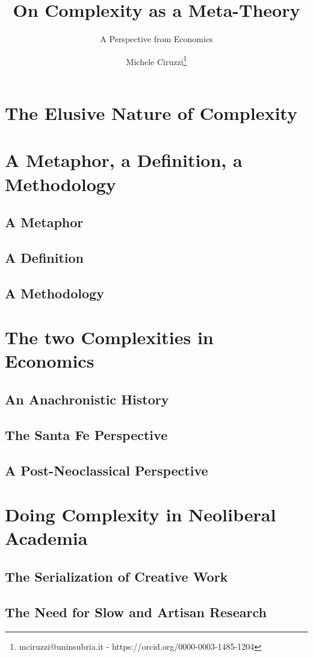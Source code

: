 \documentclass[a4paper, headings=standardclasses]{scrartcl}
\title{On Complexity as a Meta-Theory}
\subtitle{A Perspective from Economics}
\author{Michele Ciruzzi\thanks{mciruzzi@uninsubria.it - https://orcid.org/0000-0003-1485-1204}}
\begin{document}
	
	\maketitle
	
	
	\section{The Elusive Nature of Complexity}
	
	\section{A Metaphor, a Definition, a Methodology}
	\subsection{A Metaphor}
	
	\subsection{A Definition}
	
	\subsection{A Methodology}
	
	\section{The two Complexities in Economics}
	\subsection{An Anachronistic History}
	
	\subsection{The Santa Fe Perspective}
	
	\subsection{A Post-Neoclassical Perspective}
	
	\section{Doing Complexity in Neoliberal Academia}
	\subsection{The Serialization of Creative Work}
	
	\subsection{The Need for Slow and Artisan Research}
	
	\printbibliography
	
\end{document}
